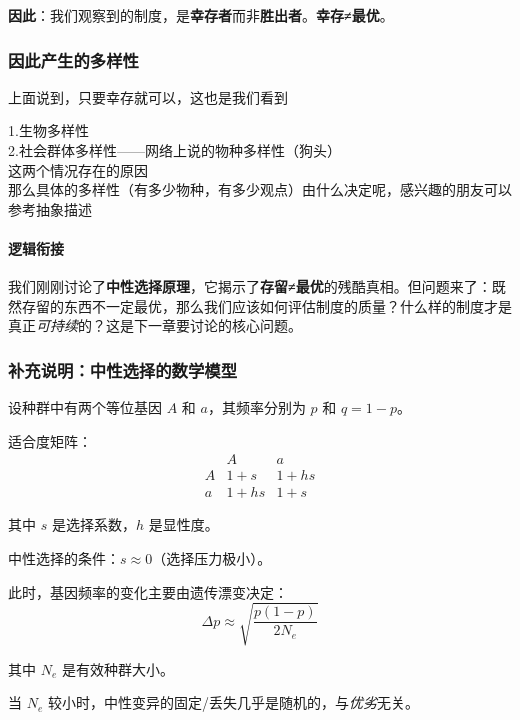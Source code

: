 \documentclass[../main.tex]{subfiles}
\begin{document}
	\textbf{\Large 因此}：我们观察到的制度，是\textbf{幸存者}而非\textbf{胜出者}。\textbf{幸存≠最优}。
	
	\subsubsection{因此产生的多样性}

上面说到，只要幸存就可以，这也是我们看到

1.生物多样性
\\
2.社会群体多样性——网络上说的物种多样性（狗头）
\\
这两个情况存在的原因
\\
那么具体的多样性（有多少物种，有多少观点）由什么决定呢，感兴趣的朋友可以参考抽象描述
\label{main:various}



	\paragraph*{逻辑衔接}
	我们刚刚讨论了\textbf{中性选择原理}，它揭示了\textbf{存留≠最优}的残酷真相。但问题来了：既然存留的东西不一定最优，那么我们应该如何评估制度的质量？什么样的制度才是真正\textit{可持续}的？这是下一章要讨论的核心问题。

	\subsubsection*{补充说明：中性选择的数学模型}
	\begin{tcolorbox}[
		colback=gray!5,
		colframe=gray!40,
		title=\small \textit{严谨推导（可跳过）},
		fonttitle=\bfseries
		]
		\small
		设种群中有两个等位基因 $A$ 和 $a$，其频率分别为 $p$ 和 $q=1-p$。

		适合度矩阵：
		\[
		\begin{array}{c|cc}
			& A & a \\
			\hline
			A & 1+s & 1+hs \\
			a & 1+hs & 1+s
		\end{array}
		\]

		其中 $s$ 是选择系数，$h$ 是显性度。

		中性选择的条件：$s \approx 0$（选择压力极小）。

		此时，基因频率的变化主要由遗传漂变决定：
		\[ \Delta p \approx \sqrt{\frac{p(1-p)}{2N_e}} \]

		其中 $N_e$ 是有效种群大小。

		当 $N_e$ 较小时，中性变异的固定/丢失几乎是随机的，与\textit{优劣}无关。
	\end{tcolorbox}
\end{document}
